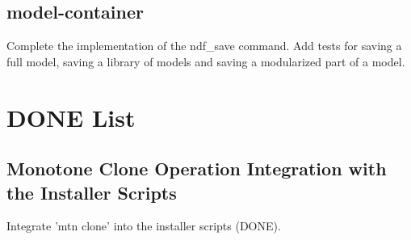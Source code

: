 \documentclass[12pt]{article}
\begin{document}
\subsection{model-container}
Complete the implementation of the ndf\_save command.  Add tests for
saving a full model, saving a library of models and saving a
modularized part of a model.

\section{DONE List}

\subsection{Monotone Clone Operation Integration with the Installer Scripts}
Integrate 'mtn clone' into the installer scripts (DONE).
\end{document}

